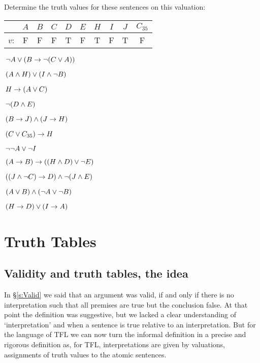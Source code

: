 \begin{practiceproblems}


\problempart Determine the truth values for these sentences on this valuation:

\begin{center}
	\begin{tabular}{rccccccccc}
		& $A$ & $B$ & $C$ & $D$ & $E$ & $H$ & $I$ & $J$ & $C_{35}$\\\hline
		$v$: & F & F & F & T & F & T & F & T & F
	\end{tabular}
\end{center}

\begin{earg}
	\item $\,\neg A \vee (B \rightarrow \neg (C \vee A))\,$
	\item $\, (A \mathbin{\wedge} H) \vee (I \mathbin{\wedge} \neg B)\,$
	\item $\, H \rightarrow (A \vee C)\,$
	\item $\, \neg (D \mathbin{\wedge} E)\,$
	\item $\, (B \rightarrow J) \mathbin{\wedge} (J \rightarrow H)\,$
	\item $\, (C \vee C_{35}) \rightarrow H\,$
	\item $\, \neg\neg A \vee \neg I\,$
	\item $\, (A \rightarrow B) \rightarrow ((H \mathbin{\wedge} D) \vee \neg E)\,$
	\item $\, ((J \mathbin{\wedge} \neg C )\rightarrow D) \mathbin{\wedge} \neg (J \mathbin{\wedge} E)\,$
	\item $\, (A \vee B) \mathbin{\wedge} (\neg A \vee \neg B)$
	\item $\, (H \rightarrow D) \vee (I \rightarrow A)\,$
\end{earg}

	
	\end{practiceproblems}

\chapter{Truth Tables}
\section{Validity and truth tables, the idea}\label{sec:valtt}
In \S\ref{s:Valid} we said that an argument was valid, if and only if there is no interpretation such that all premises are true but the conclusion false. At that point the definition was suggestive, but we lacked a clear understanding of `interpretation' and when a sentence is true relative to an interpretation. But for the language of TFL we can now turn the informal definition in a precise and rigorous definition as, for TFL, interpretations are given by valuations, assignments of truth values to the atomic sentences. 

